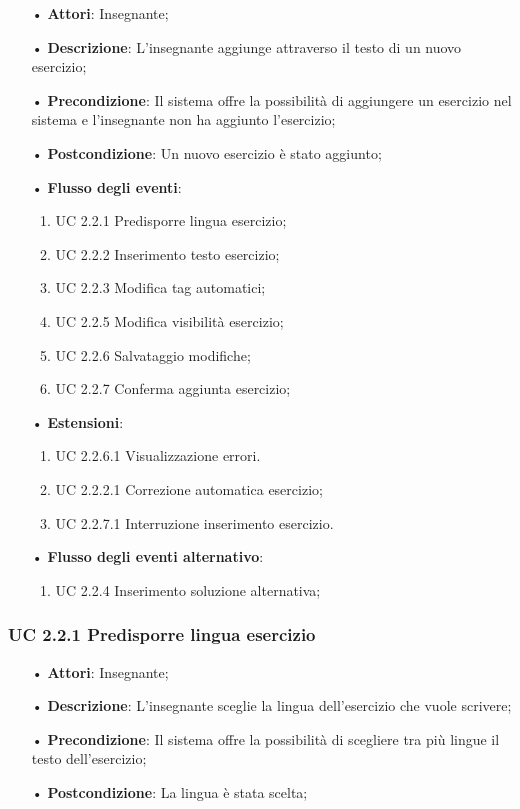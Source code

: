 \begin{itemize}
	\item[•] \textbf{Attori}: Insegnante;
	\item[•] \textbf{Descrizione}: L'insegnante aggiunge attraverso il testo di un nuovo esercizio;
	\item[•] \textbf{Precondizione}: Il sistema offre la possibilità di aggiungere un esercizio nel sistema e l'insegnante non ha aggiunto l'esercizio;
	\item[•] \textbf{Postcondizione}: Un nuovo esercizio è stato aggiunto;
	\item[•] \textbf{Flusso degli eventi}:
	\begin{enumerate}
		\item UC 2.2.1 Predisporre lingua esercizio;
		\item UC 2.2.2 Inserimento testo esercizio;
		\item UC 2.2.3 Modifica tag automatici;

		\item UC 2.2.5 Modifica visibilità esercizio;
		\item UC 2.2.6 Salvataggio modifiche;
		\item UC 2.2.7 Conferma aggiunta esercizio;
	\end{enumerate}
	\item[•] \textbf{Estensioni}:	
	\begin{enumerate}
		\item UC 2.2.6.1 Visualizzazione errori.
		\item UC 2.2.2.1 Correzione automatica esercizio;
		\item UC 2.2.7.1 Interruzione inserimento esercizio.
	\end{enumerate}
	\item[•] \textbf{Flusso degli eventi alternativo}:
	\begin{enumerate}
		\item UC 2.2.4 Inserimento soluzione alternativa;
	\end{enumerate}
\end{itemize}
\subsubsection{UC 2.2.1 Predisporre lingua esercizio}
\begin{itemize}
	\item[•] \textbf{Attori}: Insegnante;
	\item[•] \textbf{Descrizione}: L'insegnante sceglie la lingua dell’esercizio che vuole scrivere;
	\item[•] \textbf{Precondizione}: Il sistema offre la possibilità di scegliere tra più lingue il testo dell’esercizio;
	\item[•] \textbf{Postcondizione}: La lingua è stata scelta;
\end{itemize}
